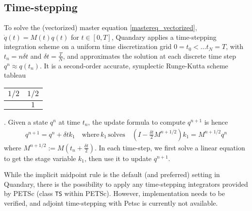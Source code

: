 \documentclass[11pt]{article}
\begin{document}
    \subsection{Time-stepping}
    To solve the (vectorized) master equation \eqref{mastereq_vectorized}, $\dot
    q(t) = M(t) q(t)$ for $t\in [0,T]$, Quandary applies a time-stepping integration
    scheme on a uniform time discretization grid $0=t_0 < \dots t_{N} = T$, with
    $t_n = n \delta t$ and $\delta t = \frac{T}{N}$, and approximates the
    solution at each discrete time step $q^{n} \approx q(t_n)$. It is a second-order accurate, symplectic Runge-Kutta scheme tableau 
    \begin{tabular}{ c | c }
      $1/2$ & $ 1/2$ \\
      \hline
                &  $1$
    \end{tabular}.
    Given a state $q^n$ at time $t_n$, the update formula to compute $q^{n+1}$
    is hence 
    \begin{align}
      q^{n+1} = q^n + \delta t k_1 \quad \text{where} \, k_1 \, \text{solves}
      \quad \left( I-\frac{\delta t}{2} M^{n+1/2} \right) k_1 = M^{n+1/2}  q^n
    \end{align}
    where $M^{n+1/2} := M(t_n + \frac{\delta t}{2})$. In each time-step, we
    first solve a linear equation to get the stage variable $k_1$, then use it
    to update $q^{n+1}$. 

    While the implicit midpoint rule is the default (and preferred) setting in Quandary, there is the possibility to apply any time-stepping integrators provided by PETSc (class \texttt{TS} within PETSc). However, implementation needs to be verified, and adjoint time-stepping with Petsc is currently not available. 
\end{document}
